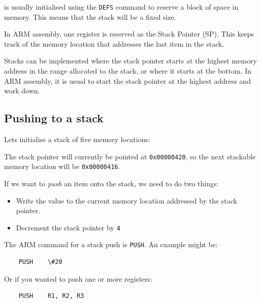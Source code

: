is usually initialised using the {\tt DEFS} command to reserve a block of space
in memory. This means that the stack will be a fixed size.

In ARM assembly, one register is reserved as the Stack Pointer (SP). This keeps
track of the memory location that addresses the last item in the stack.

Stacks can be implemented where the stack pointer starts at the highest memory
address in the range allocated to the stack, or where it starts at the bottom.
In ARM assembly, it is usual to start the stack pointer at the highest address
and work down.

\subsection{Pushing to a stack}

Lets initialise a stack of five memory locations:

\begin{center}
\begin{drawstack}
		
		
		
		
		
\end{drawstack}
\end{center}

The stack pointer will currently be pointed at {\tt 0x00000420}, so the next
stackable memory location will be {\tt 0x00000416}.

If we want to {\it push} an item onto the stack, we need to do two things:

\begin{itemize}

	\item Write the value to the current memory location addressed by the stack
	pointer.

	\item Decrement the stack pointer by {\tt 4}

\end{itemize}

The ARM command for a stack push is {\tt PUSH}. An example might be:

\begin{verbatim}
	PUSH 	\#20
\end{verbatim}

Or if you wanted to push one or more registers:

\begin{verbatim}
	PUSH 	R1, R2, R3
\end{verbatim}

